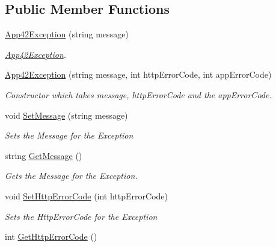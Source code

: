 \subsection*{Public Member Functions}
\begin{DoxyCompactItemize}
\item 
\hyperlink{classcom_1_1shephertz_1_1app42_1_1paas_1_1sdk_1_1csharp_1_1_app42_exception_af9101eb6189b370465d1c9da85279b84}{App42\+Exception} (string message)
\begin{DoxyCompactList}\small\item\em \hyperlink{classcom_1_1shephertz_1_1app42_1_1paas_1_1sdk_1_1csharp_1_1_app42_exception}{App42\+Exception}. \end{DoxyCompactList}\item 
\hyperlink{classcom_1_1shephertz_1_1app42_1_1paas_1_1sdk_1_1csharp_1_1_app42_exception_a9779435d3075f18cda70d17a0597fbf4}{App42\+Exception} (string message, int http\+Error\+Code, int app\+Error\+Code)
\begin{DoxyCompactList}\small\item\em Constructor which takes message, http\+Error\+Code and the app\+Error\+Code. \end{DoxyCompactList}\item 
void \hyperlink{classcom_1_1shephertz_1_1app42_1_1paas_1_1sdk_1_1csharp_1_1_app42_exception_a674e9453affa77a4179c084cc70e2ad5}{Set\+Message} (string message)
\begin{DoxyCompactList}\small\item\em Sets the Message for the Exception \end{DoxyCompactList}\item 
string \hyperlink{classcom_1_1shephertz_1_1app42_1_1paas_1_1sdk_1_1csharp_1_1_app42_exception_a754c9bb68b74ae857277665252c23579}{Get\+Message} ()
\begin{DoxyCompactList}\small\item\em Gets the Message for the Exception. \end{DoxyCompactList}\item 
void \hyperlink{classcom_1_1shephertz_1_1app42_1_1paas_1_1sdk_1_1csharp_1_1_app42_exception_aef55d0252b0e9b42a1592411e72ded73}{Set\+Http\+Error\+Code} (int http\+Error\+Code)
\begin{DoxyCompactList}\small\item\em Sets the Http\+Error\+Code for the Exception \end{DoxyCompactList}\item 
int \hyperlink{classcom_1_1shephertz_1_1app42_1_1paas_1_1sdk_1_1csharp_1_1_app42_exception_ad6c306cde64e91ec0757f12c887f3d2d}{Get\+Http\+Error\+Code} ()

\end{DoxyCompactItemize}
